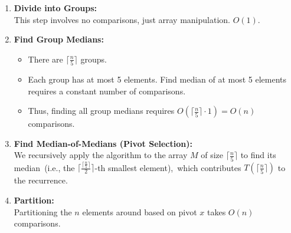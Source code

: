 \documentclass[11pt, a4paper, oneside]{memoir}
\begin{document}
\begin{enumerate}
    \item \textbf{Divide into Groups:} \\
    This step involves no comparisons, just array manipulation. $O(1)$.

    \item \textbf{Find Group Medians:}
    \begin{itemize}
        \item There are $\lceil \frac{n}{5} \rceil$ groups.
        \item Each group has at most 5 elements. Find median of at most 5 elements requires a constant number of comparisons\footnotemark.
        \item Thus, finding all group medians requires $O(\lceil \frac{n}{5} \rceil \cdot 1) = O(n)$ comparisons.
    \end{itemize}


    \item \textbf{Find Median-of-Medians (Pivot Selection):} \\
    We recursively apply the algorithm to the array $M$ of size $\lceil \frac{n}{5} \rceil$ to find its median\
    (i.e., the $\lceil \frac{\lceil \frac{n}{5} \rceil}{2} \rceil$-th smallest element),\
    which contributes $T(\lceil \frac{n}{5} \rceil)$ to the recurrence.

    \item \textbf{Partition:} \\
    Partitioning the $n$ elements around based on pivot $x$ takes $O(n)$ comparisons.


\end{enumerate}
\end{document}
